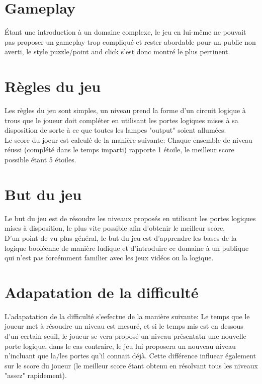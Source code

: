 \documentclass{article}
\begin{document}
\section{Gameplay}
Étant une introduction à un domaine complexe, le jeu en lui-même ne pouvait pas proposer un gameplay trop compliqué et rester abordable pour un public non averti, le style puzzle/point and click s'est donc montré le plus pertinent.\\

\section{Règles du jeu}
Les règles du jeu sont simples, un niveau prend la forme d'un circuit logique à trous que le joueur doit compléter en utilisant les portes logiques mises à sa disposition de sorte à ce que toutes les lampes "output" soient allumées.\\

Le score du joeur est calculé de la manière suivante: Chaque ensemble de niveau
réussi (complété dans le temps imparti) rapporte 1 étoile, le meilleur score possible étant 5 étoiles.\\


\section{But du jeu}
Le but du jeu est de résoudre les niveaux proposés en utilisant les portes logiques mises à disposition, le plus vite possible afin d'obtenir le meilleur score.\\

D'un point de vu plus général, le but du jeu est d'apprendre les bases de la logique booléenne de manière ludique et d'introduire ce domaine à un publique qui n'est pas forcémment familier avec les jeux vidéos ou la logique.\\

\section{Adapatation de la difficulté}
L'adapatation de la difficulté s'eefectue de la manière suivante: Le temps que le joueur met à résoudre un niveau est mesuré, et si le temps mis est en dessous d'un certain seuil, le joueur se vera proposé un niveau présentatn une nouvelle porte logique, dans le cas contraire, le jeu lui proposera un nouveau niveau n'incluant que la/les portes qu'il connait déjà. Cette différence influear également sur le score du joueur (le meilleur score étant obtenu en résolvant tous les niveaux "assez" rapidement).\\
\end{document}
